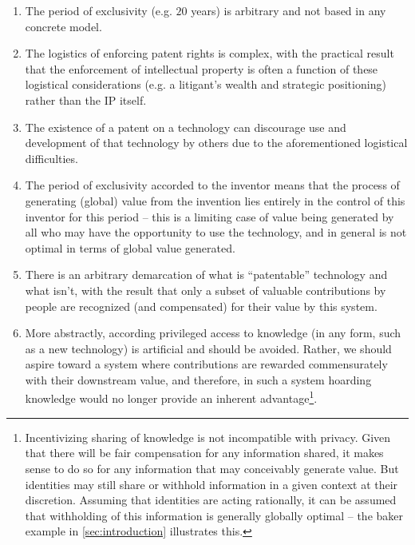 \documentclass[pra,twocolumn,groupedaddress,10pt]{revtex4}
\theoremstyle{definition}
\begin{document}
\begin{enumerate}
	\item The period of exclusivity (e.g. $20$ years) is arbitrary and not based in any concrete model.
	\item The logistics of enforcing patent rights is complex, with the practical result that the enforcement of intellectual property is often a function of these logistical considerations (e.g. a litigant's wealth and strategic positioning) rather than the IP itself.
	\item The existence of a patent on a technology can discourage use and development of that technology by others due to the aforementioned logistical difficulties.
	\item The period of exclusivity accorded to the inventor means that the process of generating (global) value from the invention lies entirely in the control of this inventor for this period -- this is a limiting case of value being generated by all who may have the opportunity to use the technology, and in general is not optimal in terms of global value generated.
	\item There is an arbitrary demarcation of what is ``patentable'' technology and what isn't, with the result that only a subset of valuable contributions by people are recognized (and compensated) for their value by this system.
	\item More abstractly, according privileged access to knowledge (in any form, such as a new technology) is artificial and should be avoided. Rather, we should aspire toward a system where contributions are rewarded commensurately with their downstream value, and therefore, in such a system hoarding knowledge would no longer provide an inherent advantage\footnote{Incentivizing sharing of knowledge is not incompatible with privacy. Given that there will be fair compensation for any information shared, it makes sense to do so for any information that may conceivably generate value. But identities may still share or withhold information in a given context at their discretion. Assuming that identities are acting rationally, it can be assumed that withholding of this information is generally globally optimal -- the baker example in \autoref{sec:introduction} illustrates this.}.
\end{enumerate}
\end{document}
